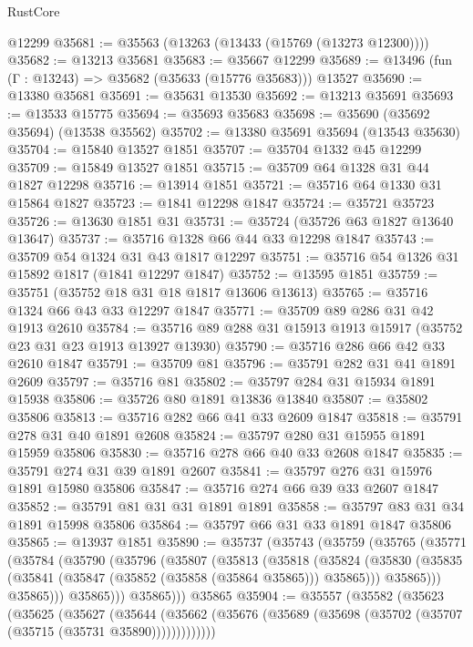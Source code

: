 \begin{lexlean}{RustCore}
\begin{coremodule}
    @12299
@35681 := @35563 (@13263 (@13433 (@15769 (@13273 @12300))))
@35682 := @13213 @35681
@35683 := @35667 @12299
@35689 := @13496 (fun (Γ : @13243) => @35682 (@35633 (@15776 @35683))) @13527
@35690 := @13380 @35681
@35691 := @35631 @13530
@35692 := @13213 @35691
@35693 := @13533 @15775
@35694 := @35693 @35683
@35698 := @35690 (@35692 @35694) (@13538 @35562)
@35702 := @13380 @35691 @35694 (@13543 @35630)
@35704 := @15840 @13527 @1851
@35707 := @35704 @1332 @45 @12299
@35709 := @15849 @13527 @1851
@35715 := @35709 @64 @1328 @31 @44 @1827 @12298
@35716 := @13914 @1851
@35721 := @35716 @64 @1330 @31 @15864 @1827
@35723 := @1841 @12298 @1847
@35724 := @35721 @35723
@35726 := @13630 @1851 @31
@35731 := @35724 (@35726 @63 @1827 @13640 @13647)
@35737 := @35716 @1328 @66 @44 @33 @12298 @1847
@35743 := @35709 @54 @1324 @31 @43 @1817 @12297
@35751 := @35716 @54 @1326 @31 @15892 @1817 (@1841 @12297 @1847)
@35752 := @13595 @1851
@35759 := @35751 (@35752 @18 @31 @18 @1817 @13606 @13613)
@35765 := @35716 @1324 @66 @43 @33 @12297 @1847
@35771 := @35709 @89 @286 @31 @42 @1913 @2610
@35784 := @35716 @89 @288 @31 @15913 @1913 @15917 (@35752 @23 @31 @23 @1913 @13927 @13930)
@35790 := @35716 @286 @66 @42 @33 @2610 @1847
@35791 := @35709 @81
@35796 := @35791 @282 @31 @41 @1891 @2609
@35797 := @35716 @81
@35802 := @35797 @284 @31 @15934 @1891 @15938
@35806 := @35726 @80 @1891 @13836 @13840
@35807 := @35802 @35806
@35813 := @35716 @282 @66 @41 @33 @2609 @1847
@35818 := @35791 @278 @31 @40 @1891 @2608
@35824 := @35797 @280 @31 @15955 @1891 @15959 @35806
@35830 := @35716 @278 @66 @40 @33 @2608 @1847
@35835 := @35791 @274 @31 @39 @1891 @2607
@35841 := @35797 @276 @31 @15976 @1891 @15980 @35806
@35847 := @35716 @274 @66 @39 @33 @2607 @1847
@35852 := @35791 @81 @31 @31 @1891 @1891
@35858 := @35797 @83 @31 @34 @1891 @15998 @35806
@35864 := @35797 @66 @31 @33 @1891 @1847 @35806
@35865 := @13937 @1851
@35890 := @35737
    (@35743
      (@35759
        (@35765
          (@35771
            (@35784
              (@35790
                (@35796
                  (@35807
                    (@35813
                      (@35818
                        (@35824
                          (@35830
                            (@35835 (@35841 (@35847 (@35852 (@35858 (@35864 @35865))) @35865)))
                            @35865)))
                      @35865)))
                @35865)))
          @35865)))
    @35865
@35904 := @35557
    (@35582
      (@35623
        (@35625
          (@35627
            (@35644
              (@35662 (@35676 (@35689 (@35698 (@35702 (@35707 (@35715 (@35731 @35890)))))))))))))

\end{coremodule}
\end{lexlean}
